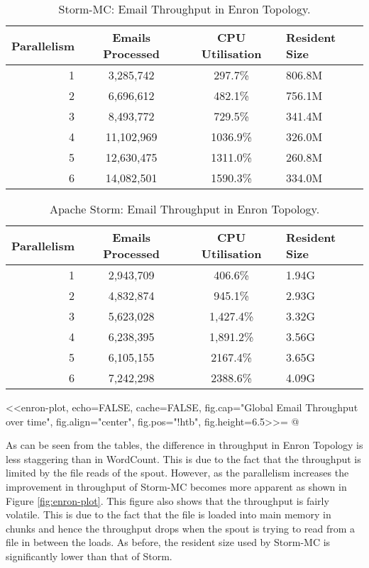\begin{table}[!htb]
\begin{adjustwidth}{-0.5in}{-0.5in}
\centering
\small
\begin{tabular}{@{}rccl@{}}
    \textbf{Parallelism} & \textbf{Emails Processed} & \textbf{CPU Utilisation} & \textbf{Resident Size} \\ \toprule
    1 & {3,285,742} & {297.7\%} & {806.8M} \\
    2 & {6,696,612} & {482.1\%} & {756.1M} \\
    3 & {8,493,772} & {729.5\%} & {341.4M} \\
    4 & {11,102,969} & {1036.9\%} & {326.0M} \\
    5 & {12,630,475} & {1311.0\%} & {260.8M} \\
    6 & {14,082,501} & {1590.3\%} & {334.0M} \\
\end{tabular}
\caption{Storm-MC: Email Throughput in Enron Topology.}
\label{table:storm_mc_enron}
\end{adjustwidth}
\end{table}

\begin{table}[!htb]
\begin{adjustwidth}{-0.5in}{-0.5in}
\centering
\small
\begin{tabular}{@{}rccl@{}}
    \textbf{Parallelism} & \textbf{Emails Processed} & \textbf{CPU Utilisation} & \textbf{Resident Size} \\ \toprule
    1 & {2,943,709} & {406.6\%} & {1.94G} \\
    2 & {4,832,874} & {945.1\%} & {2.93G} \\
    3 & {5,623,028} & {1,427.4\%} & {3.32G} \\
    4 & {6,238,395} & {1,891.2\%} & {3.56G} \\
    5 & {6,105,155} & {2167.4\%} & {3.65G} \\
    6 & {7,242,298} & {2388.6\%} & {4.09G} \\
\end{tabular}
\caption{Apache Storm: Email Throughput in Enron Topology.}
\label{table:storm_enron}
\end{adjustwidth}
\end{table}

<<enron-plot, echo=FALSE, cache=FALSE, fig.cap="Global Email Throughput over time", fig.align="center", fig.pos="!htb", fig.height=6.5>>=
@

As can be seen from the tables, the difference in throughput in Enron Topology is less staggering than in WordCount. This is due to the fact that the throughput is limited by the file reads of the spout. However, as the parallelism increases the improvement in throughput of Storm-MC becomes more apparent as shown in Figure \ref{fig:enron-plot}. This figure also shows that the throughput is fairly volatile. This is due to the fact that the file is loaded into main memory in chunks and hence the throughput drops when the spout is trying to read from a file in between the loads. As before, the resident size used by Storm-MC is significantly lower than that of Storm.

